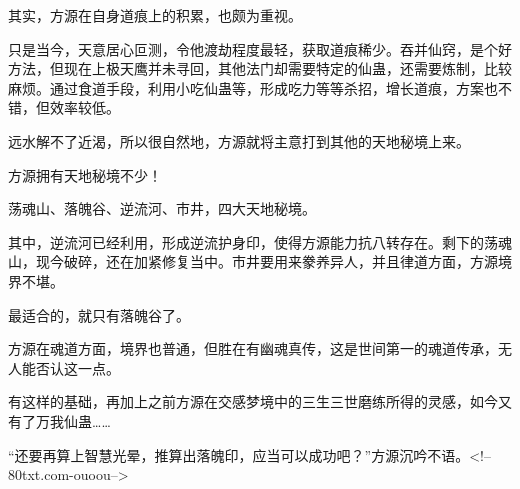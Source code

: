 \begin{this_body}
其实，方源在自身道痕上的积累，也颇为重视。

只是当今，天意居心叵测，令他渡劫程度最轻，获取道痕稀少。吞并仙窍，是个好方法，但现在上极天鹰并未寻回，其他法门却需要特定的仙蛊，还需要炼制，比较麻烦。通过食道手段，利用小吃仙蛊等，形成吃力等等杀招，增长道痕，方案也不错，但效率较低。

远水解不了近渴，所以很自然地，方源就将主意打到其他的天地秘境上来。

方源拥有天地秘境不少！

荡魂山、落魄谷、逆流河、市井，四大天地秘境。

其中，逆流河已经利用，形成逆流护身印，使得方源能力抗八转存在。剩下的荡魂山，现今破碎，还在加紧修复当中。市井要用来豢养异人，并且律道方面，方源境界不堪。

最适合的，就只有落魄谷了。

方源在魂道方面，境界也普通，但胜在有幽魂真传，这是世间第一的魂道传承，无人能否认这一点。

有这样的基础，再加上之前方源在交感梦境中的三生三世磨练所得的灵感，如今又有了万我仙蛊……

“还要再算上智慧光晕，推算出落魄印，应当可以成功吧？”方源沉吟不语。<!--80txt.com-ouoou-->

\end{this_body}

